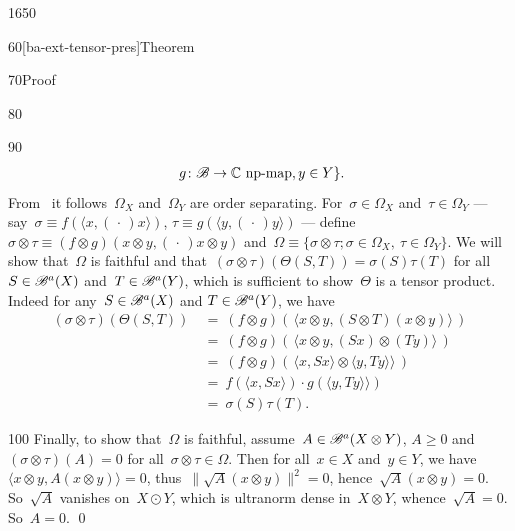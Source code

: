 \begin{parsec}{1650}
\begin{point}{60}[ba-ext-tensor-pres]{Theorem}
\begin{point}{70}{Proof}
\begin{point}{80}
\begin{point}{90}
\begin{align*}
                    \ g \colon \mathscr{B} \to \mathbb{C} \text{ np-map}, y\in Y \}.
    \end{align*}
From~
    it follows~$\Omega_X$  and~$\Omega_Y$ are order separating.
For~$\sigma \in \Omega_X$ and~$\tau \in \Omega_Y$
 --- say~$\sigma \equiv f(\langle x, (\,\cdot\,) x\rangle)$,
    $\tau \equiv g(\langle y, (\,\cdot\,) y\rangle)$ ---
    define~$\sigma \otimes \tau \equiv
        (f \otimes g) (x \otimes y, (\,\cdot\,) x\otimes y) $
        and~$\Omega \equiv \{\sigma \otimes \tau; \sigma \in \Omega_X,
                    \ \tau \in \Omega_Y\}$.
We will show
    that~$\Omega$ is faithful
    and that~$(\sigma \otimes \tau)(\Theta(S,T)) = \sigma(S) \tau(T)$
    for all~$S \in \mathscr{B}^a(X)$ and~$T \in \mathscr{B}^a(Y)$,
    which is sufficient to show~$\Theta$ is a tensor product.
Indeed for any~$S \in \mathscr{B}^a(X)$ and $T \in \mathscr{B}^a(Y)$, we have
\begin{align*}
    (\sigma \otimes \tau)(\Theta(S, T))
        &\ = \ (f \otimes g) (\, \langle x \otimes y, 
                (S \otimes T) (x \otimes y) \rangle\,)\\
        &\ = \ (f \otimes g) (\,\langle x \otimes y, 
                (S x) \otimes (T y)\rangle\,)\\
        &\ = \ (f \otimes g) (\,
            \langle x, Sx\rangle \otimes
            \langle y, Ty\rangle \rangle\,)\\
        &\ = \ 
            f(\langle x, Sx\rangle ) \cdot
            g(\langle y, Ty\rangle \rangle)\\
        &\ = \ 
            \sigma(S) \tau(T).
\end{align*}
\end{point}
\spacingfix{}
\begin{point}{100}%
Finally, to show that~$\Omega$ is faithful,
        assume~$A \in \mathscr{B}^a(X \otimes Y)$, $A \geq 0$
        and $(\sigma \otimes \tau)(A) = 0$
        for all~$\sigma \otimes \tau \in \Omega$.
Then for all~$x \in X$ and~$y \in Y$,
    we have~$\langle x\otimes y, A (x\otimes y)\rangle = 0$,
        thus~$\| \sqrt{A} (x \otimes y) \|^2 = 0$,
        hence~$\sqrt{A} (x \otimes y) = 0$.
So~$\sqrt{A}$ vanishes on~$X \odot Y$,
    which is ultranorm dense in~$X \otimes Y$,
    whence~$\sqrt{A} = 0$. So~$A = 0$.
\qed
\end{point}
\end{point}
\end{point}
\end{point}
\end{parsec}


